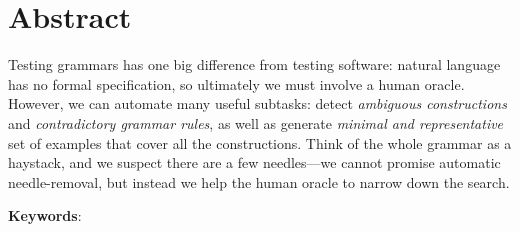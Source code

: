 \chapter*{Abstract}\label{chp:abstract}




Testing grammars has one big difference from testing software: natural language has no formal specification, 
so ultimately we must involve a human oracle. However, we can automate many useful subtasks: detect \emph{ambiguous constructions} and \emph{contradictory grammar rules}, as well as generate \emph{minimal and representative} set of examples that cover all the constructions. 
Think of the whole grammar as a haystack, and we suspect there are a few needles---we cannot promise automatic needle-removal, but instead we help the human oracle to narrow down the search.



\bigskip
\noindent
\textbf{Keywords}: \emph{\phdkeywords}
